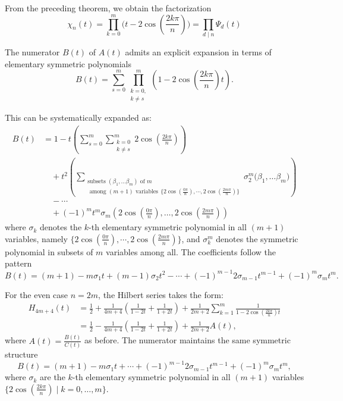 \documentclass{amsart}[12pt]
\theoremstyle{definition}
\begin{document}
From the preceding theorem, we obtain the factorization
\[
\chi_n(t)= \prod_{k=0}^{m} {\big(t-2\cos(\frac{2k\pi}{n}) \big)} = \prod _{d\mid n}\Psi _{d}(t)
\]

The numerator $B(t)$ of $A(t)$ admits an explicit expansion in terms of elementary symmetric polynomials
\[
B(t)=  \sum_{s=0}^{m} \prod_{\substack{k=0,\\ k\neq s}}^{m} {\left(1-2\cos\left(\frac{2k\pi}{n}\right)t \right)}.
\]

This can be systematically expanded as:
\begin{align*}
	B(t) &= 1 - t\left(\sum_{s=0}^{m}\sum_{\substack{k=0 \\ k\neq s}}^{m} 2\cos\left(\frac{2k\pi}{n}\right)\right) \\
   	   	&\quad +t^2\left( \sum_{\substack{ \text{subsets } (\beta_1,\dots \beta_m) \text{ of }  m \\ \text{ among } (m+1) \text{ variables}\
   \ \{2\cos(\frac{0\pi}{n}), \cdots, 2\cos(\frac{2m\pi}{n})\}} } \sigma_2^{m}\big(\beta_1,\dots \beta_m \big) \right)\\
		&\quad - \cdots \\
		&\quad + (-1)^m t^m \sigma_m\left(2\cos\left(\frac{0\pi}{n}\right), \ldots, 2\cos\left(\frac{2m\pi}{n}\right)\right)
\end{align*}
where $\sigma_k$ denotes the $k$-th elementary symmetric polynomial in all $(m+1)$ variables,
namely $\{2\cos(\frac{0\pi}{n}), \cdots, 2\cos(\frac{2m\pi}{n})\}$,
and $\sigma_k^m$ denotes the symmetric polynomial in subsets of $m$ variables among all. The coefficients follow the pattern
\[
B(t) = (m+1) -  m\sigma_1 t + (m-1)\sigma_2 t^2 -\cdots +(-1)^{m-1}  2\sigma_{m-1} t^{m-1}+(-1)^m\sigma_m t^m.
\]

For the even case $n = 2m$, the Hilbert series takes the form:
\begin{align*}
	H_{4m+4}(t) &= \frac{1}{2} + \frac{1}{4m+4}\left(\frac{1}{1-2t} + \frac{1}{1+2t}\right) + \frac{1}{2m+2}\sum_{k=1}^{m}\frac{1}{1-2\cos\left(\frac{2k\pi}{n}\right)t} \\
	&= \frac{1}{2} - \frac{1}{4m+4}\left(\frac{1}{1-2t} + \frac{1}{1+2t}\right) + \frac{1}{2m+2}A(t),
\end{align*}
where $A(t) = \frac{B(t)}{C(t)}$ as before. The numerator  maintains the same symmetric structure
\[
B(t)= (m+1) -  m\sigma_1 t +\cdots +(-1)^{m-1}  2\sigma_{m-1} t^{m-1}+(-1)^m \sigma_m t^m,
\]
where $\sigma_k$ are the $k$-th elementary symmetric polynomial in all $(m+1)$ variables  $\{2\cos\left(\frac{2k\pi}{n}\right)\mid k = 0,\ldots,m\}$.
\end{document}
